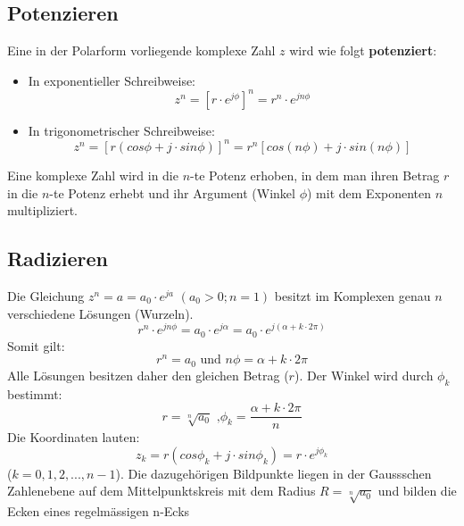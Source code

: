 \subsection{Potenzieren}
\begin{definition}
Eine in der Polarform vorliegende komplexe Zahl $z$ wird wie folgt \textbf{potenziert}:
\begin{itemize}
	\item In exponentieller Schreibweise:
	$$ z^n = [r \cdot e^{j\phi}]^n = r^n \cdot e^{jn\phi}$$
	\item In trigonometrischer Schreibweise:
	$$z^n = [r(cos\phi + j \cdot sin \phi)]^n = r^n [cos(n\phi) + j \cdot sin(n\phi)]$$
\end{itemize}
Eine komplexe Zahl wird in die $n$-te Potenz erhoben, in dem man ihren Betrag $r$ in die $n$-te Potenz erhebt und ihr Argument (Winkel $\phi$) mit dem Exponenten $n$ multipliziert.
\end{definition}

\subsection{Radizieren}
\begin{definition}
Die Gleichung $z^n = a = a_0 \cdot e^{ja}$ $(a_0 > 0; n=1)$ besitzt im Komplexen genau $n$ verschiedene Lösungen (Wurzeln).
$$r^n \cdot e^{jn\phi} = a_0  \cdot e^{j\alpha} = a_0 \cdot e^{j(\alpha +k \cdot 2\pi)} $$
Somit gilt:
$$ r^n = a_0 \text{ und } n\phi = \alpha + k \cdot 2\pi$$
Alle Lösungen besitzen daher den gleichen Betrag ($r$). Der Winkel wird durch $\phi_k$ bestimmt:
$$r = \sqrt[n]{a_0} \text{ ,}\phi_k = \frac{\alpha + k \cdot 2\pi}{n}$$
Die Koordinaten lauten:
$$ z_k = r(cos\phi_k + j \cdot sin\phi_k) = r \cdot e^{j\phi_k}$$
($k = 0,1,2,...,n-1$). Die dazugehörigen Bildpunkte liegen in der Gaussschen Zahlenebene auf dem Mittelpunktskreis mit dem Radius $R=\sqrt[n]{a_0}$ und bilden die Ecken eines regelmässigen n-Ecks 

\end{definition}